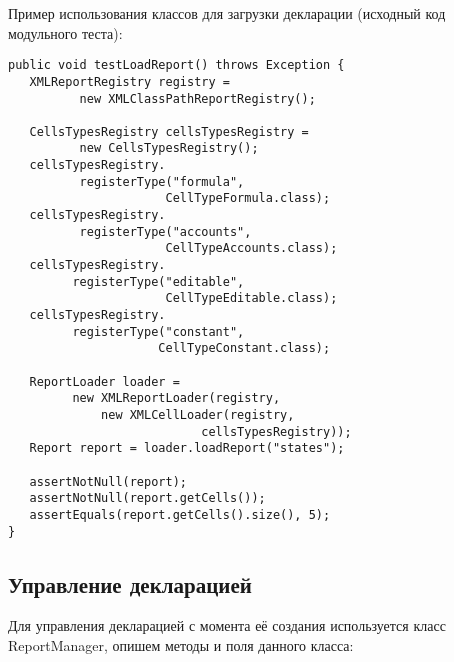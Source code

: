 \documentclass[14pt,a4paper]{reportmod}
\begin{document}
Пример использования классов для загрузки декларации (исходный код модульного теста):
\begin{small}
\begin{verbatim}
public void testLoadReport() throws Exception {
   XMLReportRegistry registry =
          new XMLClassPathReportRegistry();

   CellsTypesRegistry cellsTypesRegistry =
          new CellsTypesRegistry();
   cellsTypesRegistry.
          registerType("formula",
                      CellTypeFormula.class);
   cellsTypesRegistry.
          registerType("accounts",
                      CellTypeAccounts.class);
   cellsTypesRegistry.
         registerType("editable",
                      CellTypeEditable.class);
   cellsTypesRegistry.
         registerType("constant",
                     CellTypeConstant.class);

   ReportLoader loader =
         new XMLReportLoader(registry,
             new XMLCellLoader(registry,
                           cellsTypesRegistry));
   Report report = loader.loadReport("states");

   assertNotNull(report);
   assertNotNull(report.getCells());
   assertEquals(report.getCells().size(), 5);
}
\end{verbatim}
\end{small}

\subsection{Управление декларацией}
Для управления декларацией с момента её создания используется класс ReportManager, опишем методы и поля данного класса:
\end{document}
